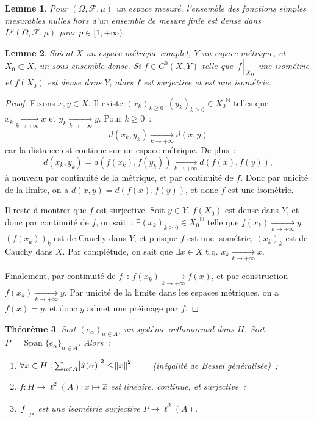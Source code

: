 \documentclass{report}
\DeclareMathOperator{\Span}{Span}
\newcommand{\N}{{\mathbb N}}
\newcommand{\tq}{\text{ t.q. }}
\newcommand{\pinfty}{{+\infty}}
\newcommand{\restr}[2]{\left.#1\vphantom{\big|}\right|_{#2}}
\newtheorem{thm}{Théorème}[chapter]
\newtheorem{lem}[thm]{Lemme}
\theoremstyle{definition}
\theoremstyle{remark}
\begin{document}
\begin{lem} Pour $(\Omega, \mathcal F, \mu)$ un espace mesuré, l'ensemble des fonctions simples mesurables nulles hors d'un ensemble de mesure finie est dense dans
$L^p(\Omega, \mathcal F, \mu)$ pour $p \in [1, \pinfty)$.
\end{lem}

\begin{lem}\label{lem:isométrie dense} Soient $X$ un espace métrique complet, $Y$ un espace métrique, et $X_0 \subset X$, un sous-ensemble dense.
Si $f \in C^0(X, Y)$ telle que $\restr f{X_0}$  une isométrie et $f(X_0)$ est dense dans $Y$, alors $f$ est surjective et est une isométrie.
\end{lem}

\begin{proof} Fixons $x, y \in X$. Il existe $(x_k)_{k \geq 0}, (y_k)_{k \geq 0} \in {X_0}^\N$ telles que $x_k \xrightarrow[k \to \pinfty]{} x$ et $y_k \xrightarrow[k \to \pinfty]{} y$.
Pour $k \geq 0$~:
\[d(x_k, y_k) \xrightarrow[k \to \pinfty]{} d(x, y)\]
car la distance est continue sur un espace métrique. De plus~:
\[d(x_k, y_k) = d\left(f(x_k), f(y_k)\right) \xrightarrow[k \to \pinfty]{} d\left(f(x), f(y)\right),\]
à nouveau par continuité de la métrique, et par continuité de $f$. Donc par unicité de la limite, on a $d(x, y) = d(f(x), f(y))$, et donc $f$ est une isométrie.

Il reste à montrer que $f$ est surjective. Soit $y \in Y$. $f(X_0)$ est dense dans $Y$, et donc par continuité de $f$, on sait~: $\exists (x_k)_{k \geq 0} \in {X_0}^\N$ telle que
$f(x_k) \xrightarrow[k \to \pinfty]{} y$. $(f(x_k))_k$ est de Cauchy dans $Y$, et puisque $f$ est une isométrie, $(x_k)_k$ est de Cauchy dans $X$. Par complétude, on sait
que $\exists x \in X \tq x_k \xrightarrow[k \to \pinfty]{} x$.

Finalement, par continuité de $f$~: $f(x_k) \xrightarrow[k \to \pinfty]{} f(x)$, et par construction $f(x_k) \xrightarrow[k \to \pinfty]{} y$. Par unicité de la limite dans les
espaces métriques, on a $f(x) = y$, et donc $y$ admet une préimage par $f$.
\end{proof}

\begin{thm}\label{thm:cefficients Fourier isométrie} Soit $(e_\alpha)_{\alpha \in A}$, un système orthonormal dans $H$. Soit $P = \Span \{e_\alpha\}_{\alpha \in A}$. Alors~:
\begin{enumerate}
	\item $\forall x \in H : \sum_{\alpha \in A}\abs {\hat x(\alpha)}^2 \leq \norm x^2 \qquad$ (inégalité de Bessel généralisée)~;
	\item $f : H \to \ell^2(A) : x \mapsto \hat x$ est linéaire, continue, et surjective~;
	\item $\restr f{\overline P}$ est une isométrie surjective $\overline P \to \ell^2(A)$.
\end{enumerate}
\end{thm}
\end{document}
